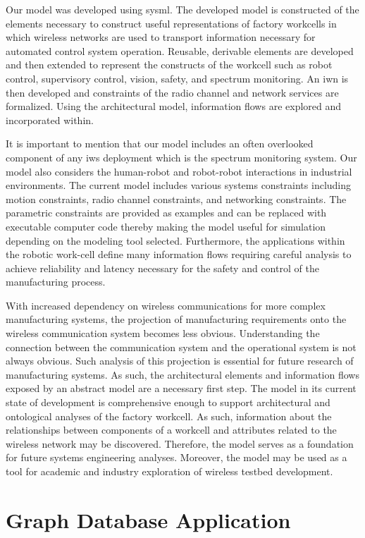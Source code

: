 Our model was developed using \gls{sysml}. The developed model is constructed of the elements necessary to construct useful representations of factory workcells in which wireless networks are used to transport information necessary for automated control system operation.  Reusable, derivable elements are developed and then extended to represent the constructs of the workcell such as robot control, supervisory control, vision, safety, and spectrum monitoring.  An \gls{iwn} is then developed and constraints of the radio channel and network services are formalized. Using the architectural model, information flows are explored and incorporated within. 

It is important to mention that our model includes an often overlooked component of any \gls{iws} deployment which is the spectrum monitoring system.  Our model also considers the human-robot and robot-robot interactions in industrial environments. The current model includes various systems constraints including motion constraints, radio channel constraints, and networking constraints. The parametric constraints are provided as examples and can be replaced with executable computer code thereby making the model useful for simulation depending on the modeling tool selected. Furthermore, the applications within the robotic work-cell define many information flows requiring careful analysis to achieve reliability and latency necessary for the safety and control of the manufacturing process.

With increased dependency on wireless communications for more complex manufacturing systems, the projection of manufacturing requirements onto the wireless communication system becomes less obvious.  Understanding the connection between the communication system and the operational system is not always obvious. Such analysis of this projection is essential for future research of manufacturing systems. As such, the architectural elements and information flows exposed by an abstract model are a necessary first step. The model in its current state of development is comprehensive enough to support architectural and ontological analyses of the factory workcell.  As such, information about the relationships between components of a workcell and attributes related to the wireless network may be discovered. Therefore, the model serves as a foundation for future systems engineering analyses. Moreover, the model may be used as a tool for academic and industry exploration of wireless testbed development.

\section{Graph Database Application}

